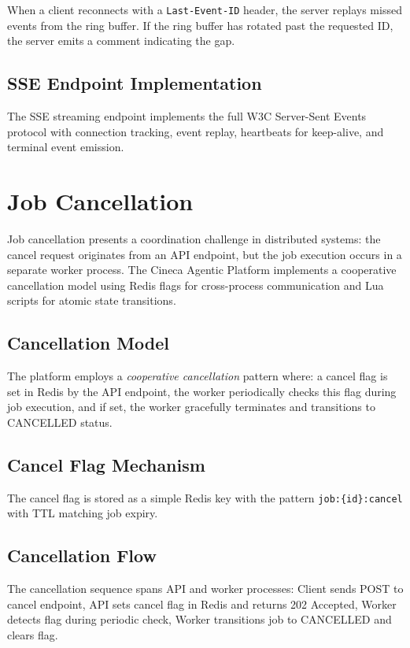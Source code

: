 \documentclass[a4paper,twoside]{sapthesis}
\begin{document}
When a client reconnects with a \texttt{Last-Event-ID} header, the server replays missed events from the ring buffer. If the ring buffer has rotated past the requested ID, the server emits a comment indicating the gap.

\subsection{SSE Endpoint Implementation}

The SSE streaming endpoint implements the full W3C Server-Sent Events protocol with connection tracking, event replay, heartbeats for keep-alive, and terminal event emission.

\section{Job Cancellation}
\label{sec:job-cancellation}

Job cancellation presents a coordination challenge in distributed systems: the cancel request originates from an API endpoint, but the job execution occurs in a separate worker process. The Cineca Agentic Platform implements a cooperative cancellation model using Redis flags for cross-process communication and Lua scripts for atomic state transitions.

\subsection{Cancellation Model}

The platform employs a \textit{cooperative cancellation} pattern where: a cancel flag is set in Redis by the API endpoint, the worker periodically checks this flag during job execution, and if set, the worker gracefully terminates and transitions to CANCELLED status.

\subsection{Cancel Flag Mechanism}

The cancel flag is stored as a simple Redis key with the pattern \texttt{job:\{id\}:cancel} with TTL matching job expiry.

\subsection{Cancellation Flow}

The cancellation sequence spans API and worker processes: Client sends POST to cancel endpoint, API sets cancel flag in Redis and returns 202 Accepted, Worker detects flag during periodic check, Worker transitions job to CANCELLED and clears flag.
\end{document}
